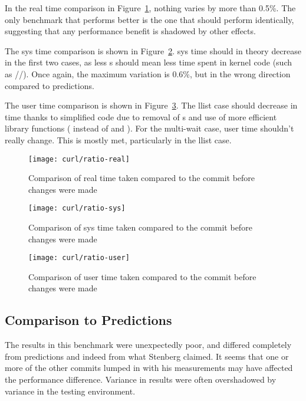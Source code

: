 In the real time comparison in Figure~\ref{firstcurl}, nothing varies by more than 0.5\%. The only benchmark that performs better is the one that should perform identically, suggesting that any performance benefit is shadowed by other effects.

The sys time comparison is shown in Figure~\ref{curlsys}. sys time should in theory decrease in the first two cases, as less \malloc{}s should mean less time spent in kernel code (such as //). Once again, the maximum variation is 0.6\%, but in the wrong direction compared to predictions.

The user time comparison is shown in Figure~\ref{lastcurl}. The llist case should decrease in time thanks to simplified code due to removal of \malloc{}s and use of more efficient library functions ( instead of \malloc{} and ). For the multi-wait case, user time shouldn't really change. This is mostly met, particularly in the llist case.

\begin{figure}[h]
	\centering
	\texttt{[image: curl/ratio-real]}
	\caption{Comparison of real time taken compared to the commit before changes were made}\label{firstcurl}
\end{figure}

\begin{figure}[p]
	\centering
	\texttt{[image: curl/ratio-sys]}
	\caption{Comparison of sys time taken compared to the commit before changes were made}\label{curlsys}
\end{figure}

\begin{figure}[p]
	\centering
	\texttt{[image: curl/ratio-user]}
	\caption{Comparison of user time taken compared to the commit before changes were made}\label{lastcurl}
\end{figure}

\subsection{Comparison to Predictions}

The results in this benchmark were unexpectedly poor, and differed completely from predictions and indeed from what Stenberg claimed. It seems that one or more of the other commits lumped in with his measurements may have affected the performance difference. Variance in results were often overshadowed by variance in the testing environment.
